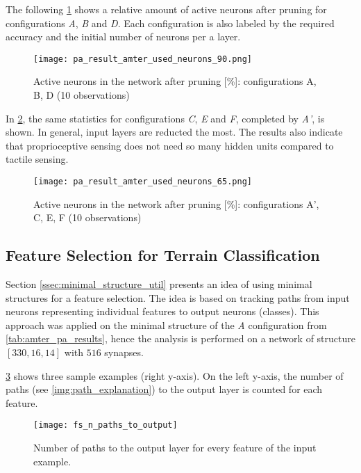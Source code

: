 The following \cref{fig:pa_amter_used_neurons_90} shows a relative amount of active neurons after pruning for configurations \textit{A}, \textit{B} and \textit{D}. Each configuration is also labeled by the required accuracy and the initial number of neurons per a layer.

\begin{figure}[H]
  \centering
  \texttt{[image: pa\_result\_amter\_used\_neurons\_90.png]}
  \caption{Active neurons in the network after pruning [\%]: configurations A, B, D (10 observations)}
  \label{fig:pa_amter_used_neurons_90}
\end{figure}

In \cref{fig:pa_amter_used_neurons_65}, the same statistics for configurations \textit{C}, \textit{E} and \textit{F}, completed by \textit{A'}, is shown. In general, input layers are reducted the most. The results also indicate that proprioceptive sensing does not need so many hidden units compared to tactile sensing.

\begin{figure}[H]
  \centering
  \texttt{[image: pa\_result\_amter\_used\_neurons\_65.png]}
  \caption{Active neurons in the network after pruning [\%]: configurations A', C, E, F (10 observations)}
  \label{fig:pa_amter_used_neurons_65}
\end{figure}

\subsection{Feature Selection for Terrain Classification} \label{ssec:pa_amter_feature_selection}
Section \ref{ssec:minimal_structure_util} presents an idea of using minimal structures for a feature selection. The idea is based on tracking paths from input neurons representing individual features to output neurons (classes). This approach was applied on the minimal structure of the \textit{A} configuration from \cref{tab:amter_pa_results}, hence the analysis is performed on a network of structure $ [330, 16, 14] $ with $ 516 $ synapses.

\cref{fig:pa_amter_n_paths_to_output} shows three sample examples (right y-axis). On the left y-axis, the number of paths (see \cref{img:path_explanation}) to the output layer is counted for each feature.

\begin{figure}[H]
  \centering
  \texttt{[image: fs\_n\_paths\_to\_output]}
  \caption{Number of paths to the output layer for every feature of the input example.}
  \label{fig:pa_amter_n_paths_to_output}
\end{figure}

